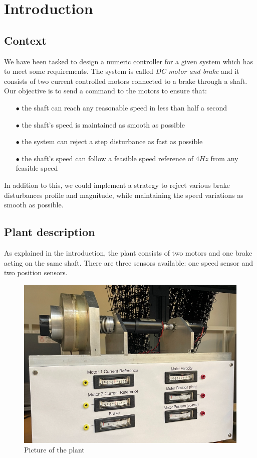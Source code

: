 \setcounter{secnumdepth}{-1}

\chapter{Introduction}

\section{Context}
\label{section:intro}

We have been tasked to design a numeric controller for a given system which has to meet some requirements. The system is 
called \textit{DC motor and brake} and it consists of two current controlled motors connected to a brake through a shaft.\\
Our objective is to send a command to the motors to ensure that:

\begin{enumerate}
    \item[$\bullet$] the shaft can reach any reasonable speed in less than half a second
    \item[$\bullet$] the shaft's speed is maintained as smooth as possible
    \item[$\bullet$] the system can reject a step disturbance as fast as possible
    \item[$\bullet$] the shaft's speed can follow a feasible speed reference of $4 Hz$ from any feasible speed
\end{enumerate}

In addition to this, we could implement a strategy to reject various brake disturbances profile and magnitude, while 
maintaining the speed variations as smooth as possible.

\section{Plant description}

As explained in the introduction, the plant consists of two motors and one brake acting on the same shaft. There are 
three sensors available: one speed sensor and two position sensors.

\begin{figure}[H]
    \centering
    \includegraphics[height=\textheight/4]{Pictures/plant_picture.png}
    \caption{Picture of the plant}
\end{figure}


